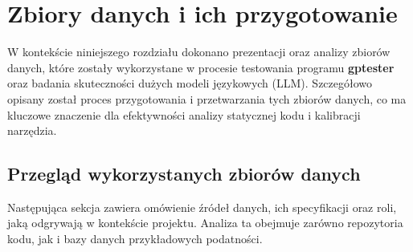 \chapter{Zbiory danych i ich przygotowanie}
\label{ch:zbiory_danych}

W kontekście niniejszego rozdziału dokonano prezentacji oraz analizy zbiorów danych, które zostały wykorzystane w procesie testowania programu \textbf{gptester} oraz badania skuteczności dużych modeli językowych (LLM). Szczegółowo opisany został proces przygotowania i przetwarzania tych zbiorów danych, co ma kluczowe znaczenie dla efektywności analizy statycznej kodu i kalibracji narzędzia.


\section{Przegląd wykorzystanych zbiorów danych}
\label{sec:przeglad_zbiorow}

Następująca sekcja zawiera omówienie źródeł danych, ich specyfikacji oraz roli, jaką odgrywają w kontekście projektu. Analiza ta obejmuje zarówno repozytoria kodu, jak i bazy danych przykładowych podatności.

